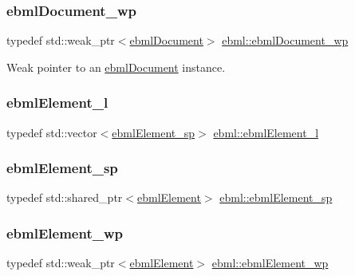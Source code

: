 \subsubsection{\texorpdfstring{ebml\+Document\+\_\+wp}{ebmlDocument\_wp}}
{\footnotesize\ttfamily typedef std\+::weak\+\_\+ptr$<$\mbox{\hyperlink{classebml_1_1ebmlDocument}{ebml\+Document}}$>$ \mbox{\hyperlink{namespaceebml_acfead4f724a6f8d55c730c6fbd362cea}{ebml\+::ebml\+Document\+\_\+wp}}}

Weak pointer to an \mbox{\hyperlink{classebml_1_1ebmlDocument}{ebml\+Document}} instance. \mbox{\label{namespaceebml_a1ddadd26791f273d851882653b9caf70}} 
\subsubsection{\texorpdfstring{ebml\+Element\+\_\+l}{ebmlElement\_l}}
{\footnotesize\ttfamily typedef std\+::vector$<$\mbox{\hyperlink{namespaceebml_adad533b7705a16bb360fe56380c5e7be}{ebml\+Element\+\_\+sp}}$>$ \mbox{\hyperlink{namespaceebml_a1ddadd26791f273d851882653b9caf70}{ebml\+::ebml\+Element\+\_\+l}}}

\mbox{\label{namespaceebml_adad533b7705a16bb360fe56380c5e7be}} 
\subsubsection{\texorpdfstring{ebml\+Element\+\_\+sp}{ebmlElement\_sp}}
{\footnotesize\ttfamily typedef std\+::shared\+\_\+ptr$<$\mbox{\hyperlink{classebml_1_1ebmlElement}{ebml\+Element}}$>$ \mbox{\hyperlink{namespaceebml_adad533b7705a16bb360fe56380c5e7be}{ebml\+::ebml\+Element\+\_\+sp}}}

\mbox{\label{namespaceebml_a495fb58b42b0050d887415351af02935}} 
\subsubsection{\texorpdfstring{ebml\+Element\+\_\+wp}{ebmlElement\_wp}}
{\footnotesize\ttfamily typedef std\+::weak\+\_\+ptr$<$\mbox{\hyperlink{classebml_1_1ebmlElement}{ebml\+Element}}$>$ \mbox{\hyperlink{namespaceebml_a495fb58b42b0050d887415351af02935}{ebml\+::ebml\+Element\+\_\+wp}}}

